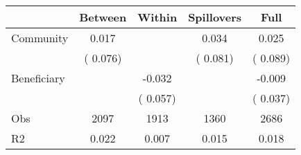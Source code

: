
\begin{tabular}{l*{4}{c}}\hline&\multicolumn{1}{c}{Between}&\multicolumn{1}{c}{Within}&\multicolumn{1}{c}{Spillovers}&\multicolumn{1}{c}{Full}\\ \hline
 Community             &              0.017      &                                               &        0.034 &         0.025                            \\ 
                               &        (       0.076)           &                                       &       (       0.081)     &      (       0.089)                                           \\ 
 Beneficiary   &                                               &       -0.032    &                                &            -0.009                            \\ 
                               &                                               & (       0.057)                  &                                        &      (       0.037)                                           \\ 
\hline                                                                                                                                                                                                                                            
 Obs                   &               2097               &       1913                       &       1360                &              2686                                               \\ 
 R2                    &                      0.022              &              0.007                      &              0.015               &                     0.018                                              \\ 
\hline \end{tabular}                                                                                                                                                                                                              